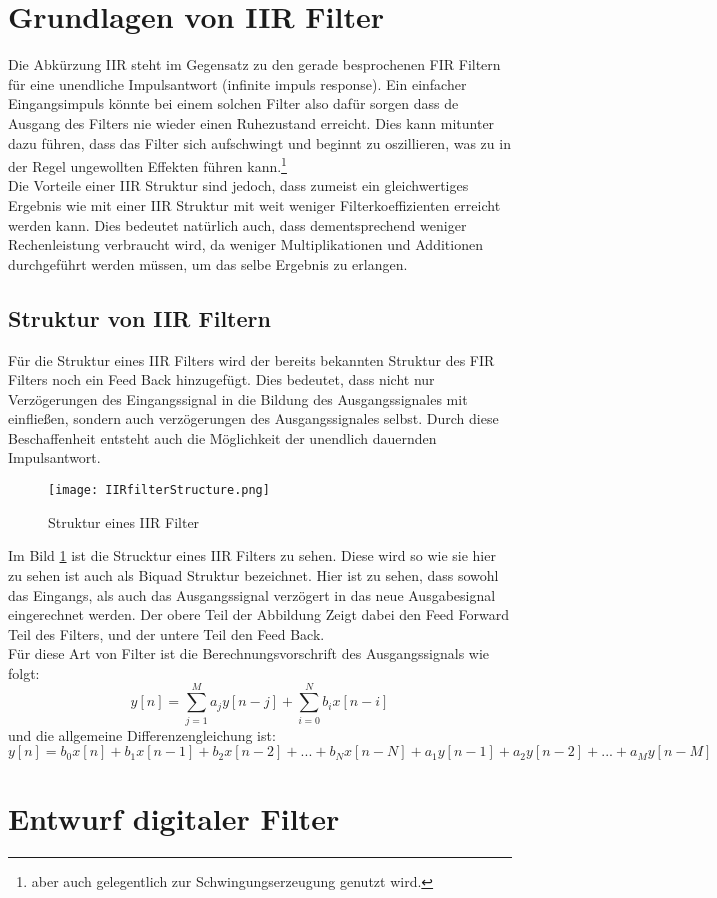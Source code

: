 \documentclass[
paper = a4,
fontsize = 11pt,
numbers=noenddot,
headsepline = true,
footsepline = true,
plainfootsepline = true,
parskip,								        %
listof = totoc,
bibliography = totoc,
index = totoc,
twoside = false
]{scrreprt}
\begin{document}
	\section{Grundlagen von IIR Filter}
	Die Abkürzung IIR steht im Gegensatz zu den gerade besprochenen FIR Filtern für eine unendliche Impulsantwort (infinite impuls response). Ein einfacher Eingangsimpuls könnte bei einem solchen Filter also dafür sorgen dass de Ausgang des Filters nie wieder einen Ruhezustand erreicht. Dies kann mitunter dazu führen, dass das Filter sich aufschwingt und beginnt zu oszillieren, was zu in der Regel ungewollten Effekten führen kann.\footnote[1]{aber auch gelegentlich zur Schwingungserzeugung genutzt wird.\cite{IIRGenerator}}\\
	Die Vorteile einer IIR Struktur sind jedoch, dass zumeist ein gleichwertiges Ergebnis wie mit einer IIR Struktur mit weit weniger Filterkoeffizienten erreicht werden kann. Dies bedeutet natürlich auch, dass dementsprechend weniger Rechenleistung verbraucht wird, da weniger Multiplikationen und Additionen durchgeführt werden müssen, um das selbe Ergebnis zu erlangen.
	\subsection{Struktur von IIR Filtern}
	Für die Struktur eines IIR Filters wird der bereits bekannten Struktur des FIR Filters noch ein  Feed Back  hinzugefügt. Dies bedeutet, dass nicht nur Verzögerungen des Eingangssignal in die Bildung des Ausgangssignales mit einfließen, sondern auch verzögerungen des Ausgangssignales selbst. Durch diese Beschaffenheit entsteht auch die Möglichkeit der unendlich dauernden Impulsantwort.
	
	\begin{figure}[ht!]
		\texttt{[image: IIRfilterStructure.png]}
		\caption{Struktur eines IIR Filter\cite{Zoelzer}}
		\label{fig:IIRfilterStructure}
	\end{figure}

	Im Bild \ref{fig:IIRfilterStructure} ist die Strucktur eines IIR Filters zu sehen. Diese wird so wie sie hier zu sehen ist auch als Biquad Struktur bezeichnet. Hier ist zu sehen, dass sowohl das Eingangs, als auch das Ausgangssignal verzögert in das neue Ausgabesignal eingerechnet werden. Der obere Teil der Abbildung Zeigt dabei den Feed Forward Teil des Filters, und der untere Teil den Feed Back.\\
	Für diese Art von Filter ist die Berechnungsvorschrift des Ausgangssignals wie folgt:
	$$y[n] = \sum_{j=1}^{M}a_j y[n-j] + \sum_{i=0}^{N}b_i x[n-i]$$ und die allgemeine Differenzengleichung ist: 
	$$y[n] = b_0x[n]+b_1x[n-1]+b_2x[n-2]+...+b_Nx[n-N]+a_1y[n-1]+a_2y[n-2]+...+a_My[n-M]$$
	\newpage
	\section{Entwurf digitaler Filter}






	
	
\end{document}
